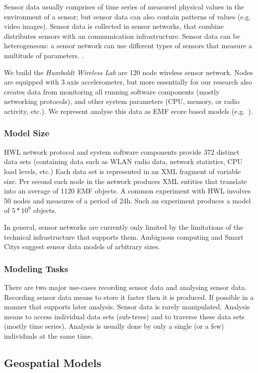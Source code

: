 Sensor data usually comprises of time series of measured physical values in the environment of a sensor; but sensor data can also contain patterns of values (e.g. video images). Sensor data is collected in sensor networks, that combine distributes sensors with an communication infrastructure. Sensor data can be heterogeneous: a sensor network can use different types of sensors that measure a multitude of parameters. . 

We build the \emph{Humboldt Wireless Lab} are 120 node wireless sensor network. Nodes are equipped with 3 axis accelerometer, but more essentially for our research also creates data from monitoring all running software components (mostly networking protocols), and other system parameters (CPU, memory, or radio activity, etc.). We represent analyse this data as EMF ecore based models (e.g.~\cite{SMTLpaper}).

\subsubsection*{Model Size}
HWL network protocol and system software components provide 372 distinct data sets (containing data such as WLAN radio data, network statistics, CPU load levels, etc.) Each data set is represented in an XML fragment of variable size. Per second each node in the network produces XML entities that translate into an average of 1120 EMF objects. A common experiment with HWL involves 50 nodes and measures of a period of 24h. Such an experiment produces a model of $5*10^9$ objects. 

In general, sensor networks are currently only limited by the limitations of the technical infrastructure that supports them. Ambiguous computing and Smart Citys  suggest sensor data models of arbitrary sizes. 

\subsubsection*{Modeling Tasks}
There are two major use-cases recording sensor data and analysing sensor data. Recording sensor data means to store it faster then it is produced. If possible in a manner that supports later analysis. Sensor data is rarely manipulated. Analysis means to access individual data sets (sub-trees) and to traverse these data sets (mostly time series). Analysis is usually done by only a single (or a few) individuals at the same time. 


\subsection{Geospatial Models}

